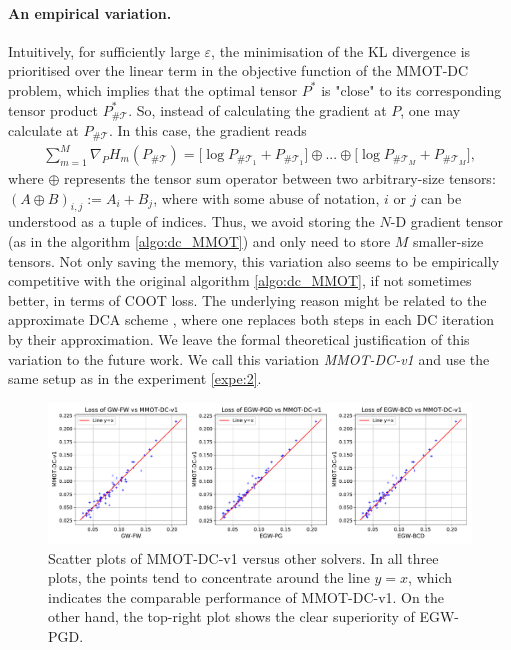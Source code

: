 \paragraph{An empirical variation.} Intuitively, for sufficiently large $\varepsilon$, the minimisation of the KL divergence is prioritised
over the linear term in the objective function of the MMOT-DC problem, which implies that the optimal tensor $P^*$ is "close" to its
corresponding tensor product $P^*_{\# \mathcal T}$. So, instead of calculating the gradient at $P$, one may calculate at
$P_{\# \mathcal T}$. In this case, the gradient reads
\begin{equation*}
  \begin{split}
    \sum_{m=1}^M \nabla_P H_m(P_{\# \mathcal T}) =
    \big[ \log P_{\# \mathcal T_1} + P_{\# \mathcal T_1} \big] \oplus ... \oplus \big[ \log P_{\# \mathcal T_M} + P_{\# \mathcal T_M} \big],
  \end{split}
\end{equation*}
where $\oplus$ represents the tensor sum operator between two arbitrary-size tensors: $(A \oplus B)_{i,j}:= A_i + B_j$, where with some
abuse of notation, $i$ or $j$ can be understood as a tuple of indices. Thus, we avoid storing the $N$-D gradient tensor (as in the
algorithm \ref{algo:dc_MMOT}) and only need to store $M$ smaller-size tensors. Not only saving the memory,
this variation also seems to be empirically competitive with the original algorithm \ref{algo:dc_MMOT}, if not sometimes better,
in terms of COOT loss. The underlying reason might be related to the approximate DCA scheme \citep{Thanh15}, where one replaces both
steps in each DC iteration by their approximation. We leave the formal theoretical justification of this variation to the future work.
We call this variation \textit{MMOT-DC-v1} and use the same setup as in the experiment \ref{expe:2}.
\begin{figure}[ht]
  \centering
  \includegraphics[width=\textwidth,height=\textheight,keepaspectratio]{./Chapitre2/fig/all_vs_MMOT-DC-v1.pdf}
  \caption{Scatter plots of MMOT-DC-v1 versus other solvers. In all three plots, the points tend to concentrate around the line $y=x$,
  which indicates the comparable performance of MMOT-DC-v1. On the other hand, the top-right plot shows the clear superiority of EGW-PGD.}
  \label{fig:coot_mmot_new}
\end{figure}

